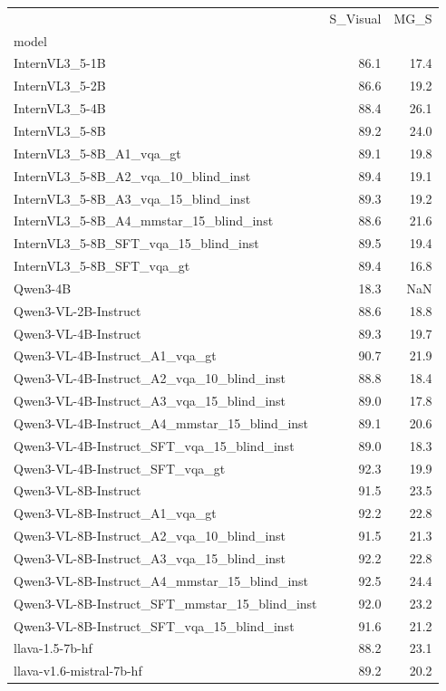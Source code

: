 \begin{tabular}{lrr}
\toprule
 & S_Visual & MG_S \\
model &  &  \\
\midrule
InternVL3_5-1B & 86.1 & 17.4 \\
InternVL3_5-2B & 86.6 & 19.2 \\
InternVL3_5-4B & 88.4 & 26.1 \\
InternVL3_5-8B & 89.2 & 24.0 \\
InternVL3_5-8B_A1_vqa_gt & 89.1 & 19.8 \\
InternVL3_5-8B_A2_vqa_10_blind_inst & 89.4 & 19.1 \\
InternVL3_5-8B_A3_vqa_15_blind_inst & 89.3 & 19.2 \\
InternVL3_5-8B_A4_mmstar_15_blind_inst & 88.6 & 21.6 \\
InternVL3_5-8B_SFT_vqa_15_blind_inst & 89.5 & 19.4 \\
InternVL3_5-8B_SFT_vqa_gt & 89.4 & 16.8 \\
Qwen3-4B & 18.3 & NaN \\
Qwen3-VL-2B-Instruct & 88.6 & 18.8 \\
Qwen3-VL-4B-Instruct & 89.3 & 19.7 \\
Qwen3-VL-4B-Instruct_A1_vqa_gt & 90.7 & 21.9 \\
Qwen3-VL-4B-Instruct_A2_vqa_10_blind_inst & 88.8 & 18.4 \\
Qwen3-VL-4B-Instruct_A3_vqa_15_blind_inst & 89.0 & 17.8 \\
Qwen3-VL-4B-Instruct_A4_mmstar_15_blind_inst & 89.1 & 20.6 \\
Qwen3-VL-4B-Instruct_SFT_vqa_15_blind_inst & 89.0 & 18.3 \\
Qwen3-VL-4B-Instruct_SFT_vqa_gt & 92.3 & 19.9 \\
Qwen3-VL-8B-Instruct & 91.5 & 23.5 \\
Qwen3-VL-8B-Instruct_A1_vqa_gt & 92.2 & 22.8 \\
Qwen3-VL-8B-Instruct_A2_vqa_10_blind_inst & 91.5 & 21.3 \\
Qwen3-VL-8B-Instruct_A3_vqa_15_blind_inst & 92.2 & 22.8 \\
Qwen3-VL-8B-Instruct_A4_mmstar_15_blind_inst & 92.5 & 24.4 \\
Qwen3-VL-8B-Instruct_SFT_mmstar_15_blind_inst & 92.0 & 23.2 \\
Qwen3-VL-8B-Instruct_SFT_vqa_15_blind_inst & 91.6 & 21.2 \\
llava-1.5-7b-hf & 88.2 & 23.1 \\
llava-v1.6-mistral-7b-hf & 89.2 & 20.2 \\

\end{tabular}
